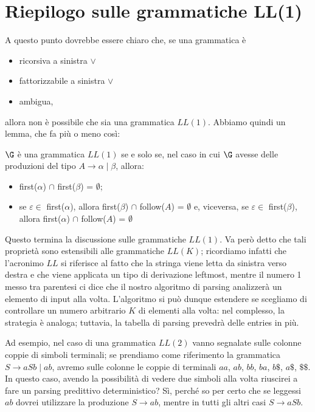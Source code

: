 \documentclass[class=book, crop=false, oneside, 12pt]{standalone}
\begin{document}
\section{Riepilogo sulle grammatiche LL(1)}
A questo punto dovrebbe essere chiaro che, se una grammatica è
\begin{itemize}
    \item ricorsiva a sinistra \(\lor\)
    \item fattorizzabile a sinistra \(\lor\)
    \item ambigua,
\end{itemize}
allora non è possibile che sia una grammatica \(LL(1)\). Abbiamo quindi un lemma, che fa più o meno così:
\begin{lemma}
    \(\G\) è una grammatica \(LL(1)\) se e solo se, nel caso in cui \(\G\) avesse delle produzioni del tipo \(A \rightarrow \alpha \mid \beta\), allora:
    \begin{itemize}
        \item first(\(\alpha\)) \(\cap\) first(\(\beta\)) = \(\emptyset\);
        \item se \(\varepsilon \in\) first(\(\alpha\)), allora first(\(\beta\)) \(\cap\) follow(\(A\)) = \(\emptyset\) e, viceversa, se \(\varepsilon \in\) first(\(\beta\)), allora first(\(\alpha\)) \(\cap\) follow(\(A\)) = \(\emptyset\)
    \end{itemize}
\end{lemma}
Questo termina la discussione sulle grammatiche \(LL(1)\). Va però detto che tali proprietà sono estensibili alle grammatiche \(LL(K)\); ricordiamo infatti che l'acronimo \(LL\) si riferisce al fatto che la stringa viene letta da sinistra verso destra e che viene applicata un tipo di derivazione leftmost, mentre il numero 1 messo tra parentesi ci dice che il nostro algoritmo di parsing analizzerà un elemento di input alla volta. L'algoritmo si può dunque estendere se scegliamo di controllare un numero arbitrario \(K\) di elementi alla volta: nel complesso, la strategia è analoga; tuttavia, la tabella di parsing prevedrà delle entries in più. 

Ad esempio, nel caso di una grammatica \(LL(2)\) vanno segnalate sulle colonne coppie di simboli terminali; se prendiamo come riferimento la grammatica \(S \rightarrow aSb \mid ab\), avremo sulle colonne le coppie di terminali \(aa\), \(ab\), \(bb\), \(ba\), \(b\$\), \(a\$\), \(\$\$\). In questo caso, avendo la possibilità di vedere due simboli alla volta riuscirei a fare un parsing predittivo deterministico? Sì, perché so per certo che se leggessi \(ab\) dovrei utilizzare la produzione \(S \rightarrow ab\), mentre in tutti gli altri casi \(S \rightarrow aSb\).
\end{document}
